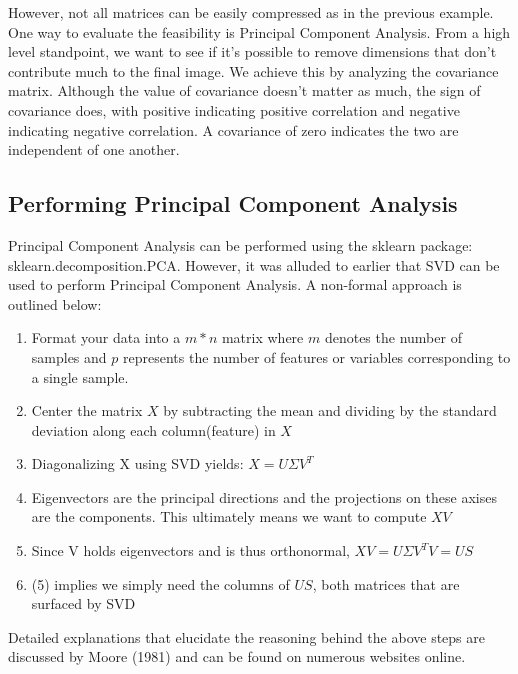 \documentclass{article}
\begin{document}
However, not all matrices can be easily compressed as in the previous example. One way to evaluate the feasibility is Principal Component Analysis. From a high level standpoint, we want to see if it's possible to remove dimensions that don't contribute much to the final image. We achieve this by analyzing the covariance matrix. Although the value of covariance doesn't matter as much, the sign of covariance does, with positive indicating positive correlation and negative indicating negative correlation. A covariance of zero indicates the two are independent of one another.

\subsection{Performing Principal Component Analysis}
Principal Component Analysis can be performed using the sklearn package:
sklearn.decomposition.PCA. However, it was alluded to earlier that SVD can be used to perform Principal Component Analysis. A non-formal approach is outlined below:

\begin{enumerate}
\item Format your data into a $m * n$ matrix where $m$ denotes the number of samples and $p$ represents the number of features or variables corresponding to a single sample.
\item Center the matrix $X$ by subtracting the mean and dividing by the standard deviation along each column(feature) in $X$
\item Diagonalizing X using SVD yields: $X = U\Sigma V^{T}$
\item Eigenvectors are the principal directions and the projections on these axises are the components. This ultimately means we want to compute $XV$
\item Since V holds eigenvectors and is thus orthonormal, $XV = U\Sigma V^{T}V = US$
\item (5) implies we simply need the columns of $US$, both matrices that are surfaced by SVD
\end{enumerate}

Detailed explanations that elucidate the reasoning behind the above steps are discussed by Moore (1981) and can be found on numerous websites online.
\end{document}
